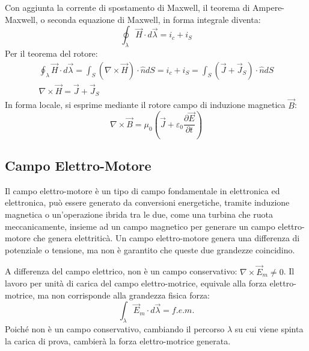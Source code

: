 \documentclass{article}
\numberwithin{equation}{subsection}
\begin{document}
\begin{center}
\end{center}

Con aggiunta la corrente di spostamento di Maxwell, il teorema di Ampere-Maxwell, o seconda equazione di Maxwell, in forma integrale diventa:
\begin{equation*}
    \oint_{\lambda}\vec{H}\cdot d\vec{\lambda}=i_c+i_S
\end{equation*}
Per il teorema del rotore:
\begin{gather*}
    \displaystyle\oint_{\lambda}\vec{H}\cdot d\vec{\lambda}=\int_S(\nabla\times\vec{H})\cdot\hat{n}dS=i_c+i_S=\int_S(\vec{J}+\vec{J}_S)\cdot\hat{n}dS\\
    \nabla\times\vec{H}=\vec{J}+\vec{J}_S
\end{gather*}
In forma locale, si esprime mediante il rotore campo di induzione magnetica $\vec{B}$:
\begin{equation}
    \nabla\times\vec{B}=\mu_0\left(\vec{J}+\varepsilon_0\displaystyle\frac{\partial \vec{E}}{\partial t}\right)
\end{equation}

\subsection{Campo Elettro-Motore}

Il campo elettro-motore è un tipo di campo fondamentale in elettronica ed elettronica, può essere generato da conversioni energetiche, tramite induzione magnetica o un'operazione 
ibrida tra le due, come una turbina che ruota meccanicamente, insieme ad un campo magnetico per generare un campo elettro-motore che genera elettriticà. Un campo elettro-motore 
genera una differenza di potenziale o tensione, ma non è garantito che queste due grandezze coincidino. 

A differenza del campo elettrico, non è un campo conservativo: $\nabla\times\vec{E}_m\neq0$. Il lavoro per unità di carica del campo elettro-motrice, equivale alla 
forza elettro-motrice, ma non corrisponde alla grandezza fisica forza:
\begin{equation*}
    \displaystyle\int_{\lambda}\vec{E}_m\cdot d\vec{\lambda}=f.e.m.
\end{equation*}
Poiché non è un campo conservativo, cambiando il percorso $\lambda$ su cui viene spinta la carica di prova, cambierà la forza elettro-motrice generata. 
\end{document}
